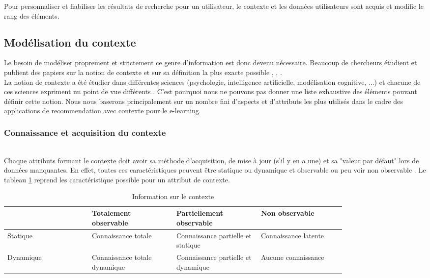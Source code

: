 \documentclass[conference]{./sty/IEEEtran}
\begin{document}
Pour personnaliser et fiabiliser les résultats de recherche pour un
utilisateur, le contexte et les données utilisateurs sont acquis et modifie le
rang des éléments. \\

\subsection{Modélisation du contexte}

Le besoin de modéliser proprement et strictement ce genre d'information est
donc devenu nécessaire. Beaucoup de chercheurs étudient et publient des papiers
sur la notion de contexte et sur sa définition la plus exacte possible
\cite{DBLP:journals/tlt/VerbertMOWDBD12},
\cite{DBLP:reference/rsh/AdomaviciusT11},
\cite{DBLP:journals/aim/AdomaviciusMRT11}. \\

La notion de contexte a été étudier dans différentes sciences (psychologie,
intelligence artificielle, modélisation cognitive, ...) et chacune de ces
sciences expriment un point de vue différents
\cite{DBLP:reference/rsh/AdomaviciusT11}. C'est pourquoi nous ne pouvons pas
donner une liste exhaustive des éléments pouvant définir cette notion. Nous
nous baserons principalement sur un nombre fini d'aspects et d'attributs les
plus utilisés dans le cadre des applications de recommendation avec contexte
pour le e-learning. \\


\subsubsection{Connaissance et acquisition du contexte}
~\\
Chaque attributs formant le contexte doit avoir sa méthode d'acquisition, de
mise à jour (s'il y en a une) et sa "valeur par défaut" lors de données
manquantes. En effet, toutes ces caractéristiques peuvent être statique ou
dynamique et observable ou peu voir non observable
\cite{DBLP:journals/aim/AdomaviciusMRT11}. Le tableau
\ref{tab:update_observability_context} reprend les caractéristique possible
pour un attribut de contexte. \\

\begin{table}
  \caption{\label{tab:update_observability_context} Information sur le contexte}
  \begin{tabular}{|p{0.20\linewidth}|p{0.20\linewidth}|p{0.20\linewidth}|p{0.20\linewidth}|}
    \hline
    ~ & Totalement observable & Partiellement observable & Non observable \\ \hline
    Statique & Connaissance totale & Connaissance partielle et statique & Connaissance latente \\ \hline
    Dynamique & Connaissance totale dynamique & Connaissance partielle et dynamique & Aucune connaissance \\ \hline
  \end{tabular}
\end{table}
\end{document}
